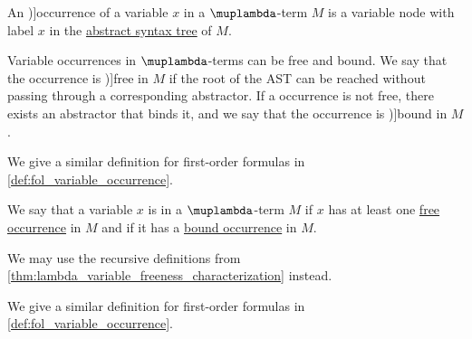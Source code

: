 \begin{definition}\label{def:lambda_variable_occurrence}\mimprovised
  An \term[en=occurrence (\cite[9A2]{Hindley1997BasicSTT})]{occurrence} of a variable \( x \) in a \( \muplambda \)-term \( M \) is a variable node with label \( x \) in the \hyperref[def:lambda_term_ast]{abstract syntax tree} of \( M \).

  Variable occurrences in \( \muplambda \)-terms can be free and bound. We say that the occurrence is \term[en=free (occurrence) (\cite[1A6]{Hindley1997BasicSTT})]{free} in \( M \) if the root of the AST can be reached without passing through a corresponding abstractor. If a occurrence is not free, there exists an abstractor that binds it, and we say that the occurrence is \term[en=bound (occurrence) (\cite[1A6]{Hindley1997BasicSTT})]{bound} in \( M \).
\end{definition}
\begin{comments}
  \item We give a similar definition for first-order formulas in \cref{def:fol_variable_occurrence}.
\end{comments}

\begin{definition}\label{def:lambda_variable_freeness}
  We say that a variable \( x \) is  in a \( \muplambda \)-term \( M \) if \( x \) has at least one \hyperref[def:lambda_variable_occurrence]{free occurrence} in \( M \) and  if it has a \hyperref[def:lambda_variable_occurrence]{bound occurrence} in \( M \).
\end{definition}
\begin{comments}
  \item We may use the recursive definitions from \cref{thm:lambda_variable_freeness_characterization} instead.
  \item We give a similar definition for first-order formulas in \cref{def:fol_variable_occurrence}.
\end{comments}


